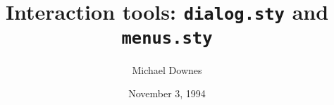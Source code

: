 %

\title{Interaction tools: {\tt dialog.sty} and {\tt menus.sty}}
\author{Michael Downes}
\date{November 3, 1994}


\renewcommand{\thepart}{\arabic{part}}
\renewcommand{\thesection}{\thepart.\arabic{section}}

\def\PrintMacroName#1{}
%

\setlength{\MacroIndent}{0pt}
\def\MacroFont{\verbatimfont}% doc.sty uses \MacroFont

\DontCheckModules

\multicoldefaultlayout

\jobswitch %
\maketitle
\thispagestyle{empty}


